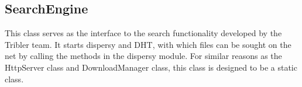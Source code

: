 \subsection{SearchEngine}
This class serves as the interface to the search functionality developed by the Tribler team. It starts dispersy and DHT,
with which files can be sought on the net by calling the methods in the dispersy module. For similar reasons as the HttpServer class and
DownloadManager class, this class is designed to be a static class.

